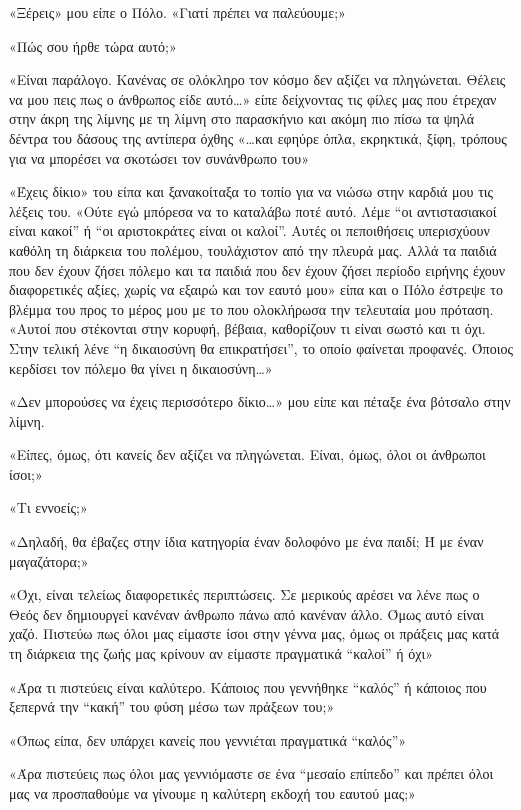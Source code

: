 \documentclass[12pt,twoside, openany]{book}
\begin{document}
«Ξέρεις» μου είπε ο Πόλο. «Γιατί πρέπει να παλεύουμε;»

«Πώς σου ήρθε τώρα αυτό;»

«Είναι παράλογο. Κανένας σε ολόκληρο τον κόσμο δεν αξίζει να πληγώνεται. Θέλεις να μου πεις πως ο άνθρωπος είδε αυτό…» είπε δείχνοντας τις φίλες μας που έτρεχαν στην άκρη της λίμνης με τη λίμνη στο παρασκήνιο και ακόμη πιο πίσω τα ψηλά δέντρα του δάσους της αντίπερα όχθης «…και εφηύρε όπλα, εκρηκτικά, ξίφη, τρόπους για να μπορέσει να σκοτώσει τον συνάνθρωπο του»

«Έχεις δίκιο» του είπα και ξανακοίταξα το τοπίο για να νιώσω στην καρδιά μου τις λέξεις του. «Ούτε εγώ μπόρεσα να το καταλάβω ποτέ αυτό. Λέμε “οι αντιστασιακοί είναι κακοί” ή “οι αριστοκράτες είναι οι καλοί”. Αυτές οι πεποιθήσεις υπερισχύουν καθόλη τη διάρκεια του πολέμου, τουλάχιστον από την πλευρά μας. Αλλά τα παιδιά που δεν έχουν ζήσει πόλεμο και τα παιδιά που δεν έχουν ζήσει περίοδο ειρήνης έχουν διαφορετικές αξίες, χωρίς να εξαιρώ και τον εαυτό μου» είπα και ο Πόλο έστρεψε το βλέμμα του προς το μέρος μου με το που ολοκλήρωσα την τελευταία μου πρόταση. «Αυτοί που στέκονται στην κορυφή, βέβαια, καθορίζουν τι είναι σωστό και τι όχι. Στην τελική λένε “η δικαιοσύνη θα επικρατήσει”, το οποίο φαίνεται προφανές. Όποιος κερδίσει τον πόλεμο θα γίνει η δικαιοσύνη…»

«Δεν μπορούσες να έχεις περισσότερο δίκιο…» μου είπε και πέταξε ένα βότσαλο στην λίμνη.

«Είπες, όμως, ότι κανείς δεν αξίζει να πληγώνεται. Είναι, όμως, όλοι οι άνθρωποι ίσοι;»

«Τι εννοείς;»

«Δηλαδή, θα έβαζες στην ίδια κατηγορία έναν δολοφόνο με ένα παιδί; Ή με έναν μαγαζάτορα;»

«Όχι, είναι τελείως διαφορετικές περιπτώσεις. Σε μερικούς αρέσει να λένε πως ο Θεός δεν δημιουργεί κανέναν άνθρωπο πάνω από κανέναν άλλο. Όμως αυτό είναι χαζό. Πιστεύω πως όλοι μας είμαστε ίσοι στην γέννα μας, όμως οι πράξεις μας κατά τη διάρκεια της ζωής μας κρίνουν αν είμαστε πραγματικά “καλοί” ή όχι»

«Άρα τι πιστεύεις είναι καλύτερο. Κάποιος που γεννήθηκε “καλός” ή κάποιος που ξεπερνά την “κακή” του φύση μέσω των πράξεων του;»

«Όπως είπα, δεν υπάρχει κανείς που γεννιέται πραγματικά “καλός”»

«Άρα πιστεύεις πως όλοι μας γεννιόμαστε σε ένα “μεσαίο επίπεδο” και πρέπει όλοι μας να προσπαθούμε να γίνουμε η καλύτερη εκδοχή του εαυτού μας;»
\end{document}
